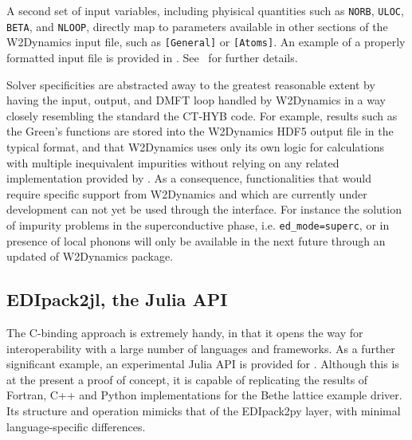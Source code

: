 \documentclass[edipack_sp.tex]{subfiles}
\begin{document}
A second set of input variables, including phyisical quantities such as {\tt NORB}, {\tt ULOC}, {\tt BETA}, and {\tt   NLOOP}, directly map to parameters available in other sections of the W2Dynamics input file, such as {\tt [General]} or {\tt [Atoms]}. An example of a properly formatted input file is provided in . See~\cite{Wallerberger2019CPC}
for further details.


Solver specificities are abstracted away to the greatest reasonable extent by having the input, output, and DMFT loop handled by W2Dynamics in a way closely resembling the standard the CT-HYB code. For example, results such as the Green's functions are stored into the W2Dynamics HDF5 output file in the typical format, and that W2Dynamics uses only its own logic for calculations with multiple inequivalent impurities without relying on any related implementation provided by \NAME{}. As a consequence, functionalities that would require specific support from W2Dynamics and which are currently under development can not yet be used through the interface. For instance the solution of impurity problems in the superconductive phase, i.e. {\tt ed\_mode=superc}, or in presence of local phonons will only be available in the next future through an updated of W2Dynamics package.



\subsection{EDIpack2jl, the Julia API}\label{sSecInteropEDIjl}
The C-binding approach is extremely handy, in that it opens the way for interoperability  with a large number of languages and frameworks. 
As a further significant example, an experimental Julia API 
is provided for \NAME. Although this is at the present a proof of concept, it is capable of replicating the results of Fortran, C++ and
Python implementations for the Bethe lattice example driver.
Its structure and operation mimicks that of the EDIpack2py layer, with minimal language-specific differences.
\end{document}
